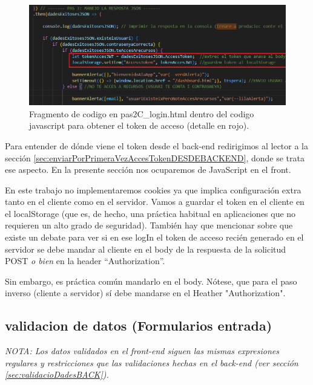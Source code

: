 \documentclass[a4paper,12pt]{report}
\begin{document}
			\setlength{\belowcaptionskip}{3pt}
			\FloatBarrier
			\begin{figure}[H]
				\centering
				\caption{Fragmento de codigo en pas2C\_login.html dentro del codigo javascript para obtener el token de acceso (detalle en rojo).}
				\includegraphics[width=1\textwidth]{img/jwtFetchLoginFront.png}
				
				\label{fig:figuraLoginFetch} 
			\end{figure}
			\FloatBarrier
			
			
			Para entender de dónde viene el token desde el back-end redirigimos al lector a la sección \ref{sec:enviarPorPrimeraVezAccesTokenDESDEBACKEND}, donde se trata ese aspecto. En la presente sección nos ocuparemos de JavaScript en el front.
			
			En este trabajo no implementaremos cookies ya que implica configuración extra tanto en el cliente como en el servidor. Vamos a guardar el token en el cliente en el localStorage (que es, de hecho, una práctica habitual en aplicaciones que no requieren un alto grado de seguridad). También hay que mencionar sobre que existe un debate para ver si en ese logIn el token de acceso recién generado en el servidor se debe mandar al cliente en el body de la respuesta de la solicitud POST \textit{o bien} en la header ``Authorization''. 
			
			Sin embargo, es práctica común mandarlo en el body. Nótese, que para el paso inverso (cliente a servidor) sí debe mandarse en el Heather "Authorization". 
			

			
			\subsection{validacion de datos (Formularios entrada)}
			\label{sec:validacioDadesFRONT}
			
			\textit{NOTA: Los datos validados en el front-end siguen las mismas expresiones regulares y restricciones que las validaciones hechas en el back-end (ver sección \ref{sec:validacioDadesBACK}).}
			
\end{document}
